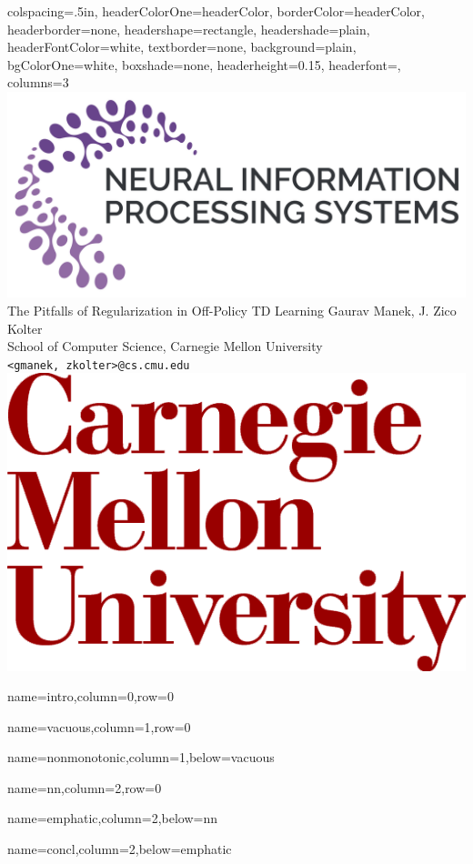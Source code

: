 \documentclass[landscape,paperwidth=96in,paperheight=42in,fontscale=0.2]{baposter}
\begin{document}
\begin{poster}{
    colspacing=.5in,
    headerColorOne=headerColor, borderColor=headerColor,
    headerborder=none, headershape=rectangle,
    headershade=plain, headerFontColor=white, textborder=none,
    background=plain, bgColorOne=white, boxshade=none,
    headerheight=0.15\textheight,
    headerfont=\headerfont,
    columns=3
  }{
    \includegraphics[height=0.11\textheight]{images/neurips-logo}
  }{
    {{\titlefont The Pitfalls of Regularization in Off-Policy TD Learning }}
  }{\vspace{2mm}\large
    Gaurav Manek, J. Zico Kolter \\
    School of Computer Science, Carnegie Mellon University \\
    \texttt{<gmanek, zkolter>@cs.cmu.edu}
  }{\includegraphics[height=0.11\textheight]{images/cmu-logo}}

  {name=intro,column=0,row=0}{}

  {name=vacuous,column=1,row=0}{}

  {name=nonmonotonic,column=1,below=vacuous}{}

  {name=nn,column=2,row=0}{}

  {name=emphatic,column=2,below=nn}{}

  {name=concl,column=2,below=emphatic}{}


\end{poster}
\end{document}
